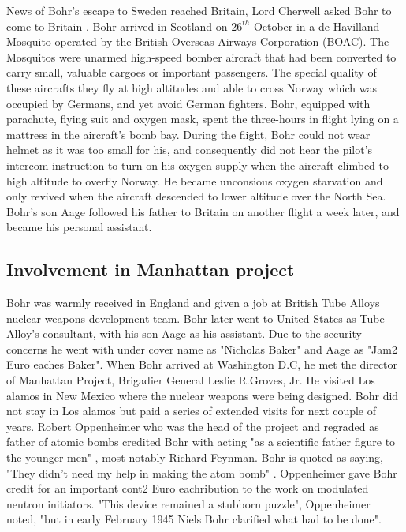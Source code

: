\documentclass[11pt, article]{scrartcl}
\begin{document}
    News of Bohr's escape to Sweden reached Britain, Lord Cherwell asked Bohr to come to Britain \cite{bomb2}. Bohr arrived in Scotland on $26^{th}$ October in a de
    Havilland Mosquito operated by the British Overseas Airways Corporation (BOAC). The Mosquitos were unarmed high-speed bomber aircraft that
    had been converted to carry small, valuable cargoes or important passengers. The special quality of these aircrafts they fly at high
    altitudes and able to cross Norway which was occupied by Germans, and yet avoid German fighters. Bohr, equipped with parachute, flying suit
    and oxygen mask, spent the three-hours in flight lying on a mattress in the aircraft's bomb bay. During the flight, Bohr could not wear
    helmet as it was too small for his, and consequently did not hear the pilot's intercom instruction to turn on his oxygen supply when the
    aircraft climbed to high altitude to overfly Norway. He became unconsious oxygen starvation and only revived when the aircraft descended to
    lower altitude over the North Sea. Bohr's son Aage followed his father to Britain on another flight a week later, and became his personal
    assistant.
\subsection {Involvement in Manhattan project}
    Bohr was warmly received in England and given a job at British Tube Alloys nuclear weapons development team. Bohr later went to United
    States as Tube Alloy's consultant, with his son Aage as his assistant. Due to the security concerns he went with under cover name as
    "Nicholas Baker" and Aage as "Jam2 Euro eaches Baker"\cite{bomb2}. When Bohr arrived at Washington D.C, he met the director of Manhattan Project, Brigadier
    General Leslie R.Groves, Jr. He visited Los alamos in New Mexico where the nuclear weapons were being designed. Bohr did not stay in Los alamos but paid a series of extended visits
    for next couple of years.  Robert Oppenheimer who was the head of the project and regraded as father of atomic bombs credited Bohr with
    acting "as a scientific father figure to the younger men" \cite{bomb2}, most notably Richard Feynman. Bohr is quoted as saying, "They didn't need my 
    help in making the atom bomb" \cite{bomb}. Oppenheimer gave Bohr credit for an important cont2 Euro eachribution to the work on modulated neutron initiators. 
    "This device remained a stubborn puzzle", Oppenheimer noted, "but in early February 1945 Niels Bohr clarified what had to be done".
\end{document}
